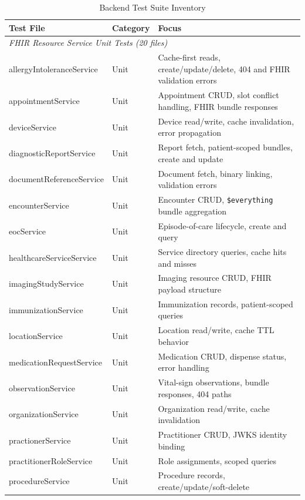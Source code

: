 \begin{table}[H]
\centering
\caption{Backend Test Suite Inventory}
\label{tab:backend-test-suites}
\setlength{\tabcolsep}{4pt}
\begin{tabular}{|p{5.5cm}|p{2.2cm}|p{6cm}|}
\hline
\textbf{Test File} & \textbf{Category} & \textbf{Focus} \\
\hline
\multicolumn{3}{|l|}{\textit{FHIR Resource Service Unit Tests (20 files)}} \\ \hline
allergyIntoleranceService & Unit & Cache-first reads, create/update/delete, 404 and FHIR validation errors \\
appointmentService        & Unit & Appointment CRUD, slot conflict handling, FHIR bundle responses \\
deviceService             & Unit & Device read/write, cache invalidation, error propagation \\
diagnosticReportService   & Unit & Report fetch, patient-scoped bundles, create and update \\
documentReferenceService  & Unit & Document fetch, binary linking, validation errors \\
encounterService          & Unit & Encounter CRUD, \texttt{\$everything} bundle aggregation \\
eocService                & Unit & Episode-of-care lifecycle, create and query \\
healthcareServiceService  & Unit & Service directory queries, cache hits and misses \\
imagingStudyService       & Unit & Imaging resource CRUD, FHIR payload structure \\
immunizationService       & Unit & Immunization records, patient-scoped queries \\
locationService           & Unit & Location read/write, cache TTL behavior \\
medicationRequestService  & Unit & Medication CRUD, dispense status, error handling \\
observationService        & Unit & Vital-sign observations, bundle responses, 404 paths \\
organizationService       & Unit & Organization read/write, cache invalidation \\
practionerService         & Unit & Practitioner CRUD, JWKS identity binding \\
practitionerRoleService   & Unit & Role assignments, scoped queries \\
procedureService          & Unit & Procedure records, create/update/soft-delete \\

\end{tabular}
\end{table}
